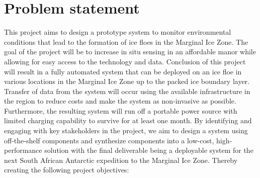 \section{Problem statement}
\label{subsec:ch1.section2}

This project aims to design a prototype system to monitor environmental conditions that lead to the formation of ice floes in the Marginal Ice Zone. The goal of the project will be to increase in situ sensing in an affordable manor while allowing for easy access to the technology and data.  Conclusion of this project will result in a fully automated system that can be deployed on an ice floe in various locations in the Marginal Ice Zone up to the packed ice boundary layer. Transfer of data from the system will occur using the available infrastructure in the region to reduce costs and make the system as non-invasive as possible. Furthermore, the resulting system will run off a portable power source with limited charging capability to survive for at least one month. By identifying and engaging with key stakeholders in the project, we aim to design a system using off-the-shelf components and synthesize components into a low-cost, high-performance solution with the final deliverable being a deployable system for the next South African Antarctic expedition to the Marginal Ice Zone.  Thereby creating the following project objectives:
